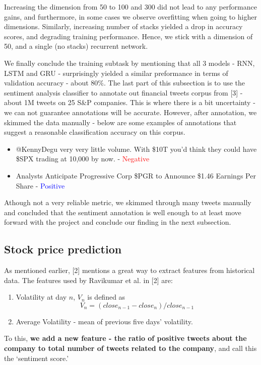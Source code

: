 \documentclass{article}
\begin{document}
Increasing the dimension from 50 to 100 and 300 did not lead to any performance gains, and furthermore, in some cases we observe overfitting when going to higher dimensions. Similarly, increasing number of stacks yielded a drop in accuracy scores, and degrading training performance. Hence, we stick with a dimension of 50, and a single (no stacks) recurrent network.

We finally conclude the training subtask by mentioning that all 3 models - RNN, LSTM and GRU - surprisingly yielded a similar preformance in terms of validation accuracy - about 80\%. The last part of this subsection is to use the sentiment analysis classifier to annotate out financial tweets corpus from [3] - about 1M tweets on 25 S\&P companies. This is where there is a bit uncertainty - we can not guarantee annotations will be accurate. However, after annotation, we skimmed the data manually - below are some examples of annotations that suggest a reasonable classification accuracy on this corpus.

\begin{itemize}
    \item @KennyDegu very very little volume. With \$10T you'd think they could have \$SPX  trading at 10,000 by now. - \textcolor{red}{Negative}
    \item Analysts Anticipate Progressive Corp \$PGR to Announce \$1.46 Earnings Per Share - \textcolor{blue}{Positive}
\end{itemize}
Athough not a very reliable metric, we skimmed through many tweets manually and concluded that the sentiment annotation is well enough to at least move forward with the project and conclude our finding in the next subsection.

\subsection{Stock price prediction}
As mentioned earlier, [2] mentions a great way to extract features from historical data. The features used by Ravikumar et al. in [2] are:
\begin{enumerate}
    \item Volatility at day $n$, $V_n$ is defined as $$V_n = (close_{n-1} - close_n)/close_{n-1}$$
    \item Average Volatility - mean of previous five days' volatility.
\end{enumerate}

To this, \textbf{we add a new feature - the ratio of positive tweets about the company to total number of tweets related to the company}, and call this the `sentiment score.'
\end{document}
